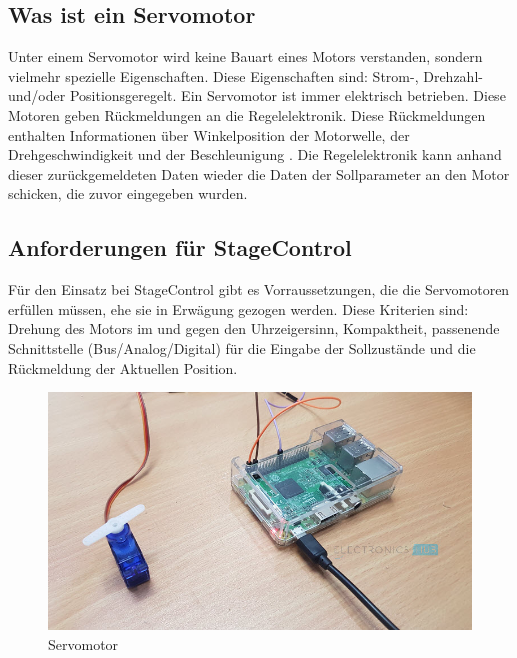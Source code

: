 \subsection{Was ist ein Servomotor}
Unter einem Servomotor wird keine Bauart eines Motors verstanden, sondern vielmehr spezielle Eigenschaften. Diese Eigenschaften sind: Strom-, Drehzahl- und/oder Positionsgeregelt. Ein Servomotor ist immer elektrisch betrieben. Diese Motoren geben Rückmeldungen an die Regelelektronik. Diese Rückmeldungen enthalten Informationen über Winkelposition der Motorwelle, der Drehgeschwindigkeit und der Beschleunigung \parencite{ServomotorInfo}. Die Regelelektronik kann anhand dieser zurückgemeldeten Daten wieder die Daten der Sollparameter an den Motor schicken, die zuvor eingegeben wurden. \\


\subsection{Anforderungen für StageControl}
Für den Einsatz bei StageControl gibt es Vorraussetzungen, die die Servomotoren erfüllen müssen, ehe sie in Erwägung gezogen werden. Diese Kriterien sind: Drehung des Motors im und gegen den Uhrzeigersinn, Kompaktheit, passenende Schnittstelle (Bus/Analog/Digital) für die Eingabe der Sollzustände und die Rückmeldung der Aktuellen Position.

\begin{figure}[H]
	\centering
	\includegraphics[width=0.7\linewidth]{images/servo.jpg}
	\caption[Servomotor]{Servomotor}
	\label{fig:Servo}
\end{figure}

\newpage
